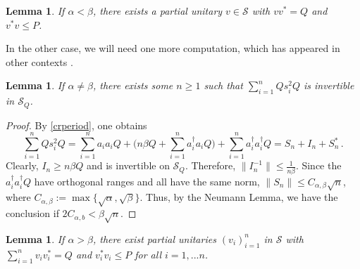 \documentclass[12pt]{amsart}
\numberwithin{equation}{section}
\def\a{\alpha}
\def\b{\beta}
\newtheorem{lem}[thm]{Lemma}
\theoremstyle{definition}
\begin{document}
\begin{lem}\label{odd}
  If $\a<\b$, there exists a partial unitary $v\in\mathcal{S}$ with $vv^*=Q$ and
  $v^*v\leq P$.
\end{lem}
In the other case, we will need one more computation, which has appeared in other contexts \cite{Sn}.
\begin{lem} \label{inverse}
If $\a\neq\b$, there exists some $n\geq 1$ such that $\sum_{i=1}^n Qs_i^2Q$ is invertible in $\mathcal S_Q$.
\end{lem}
\begin{proof}
By \eqref{crperiod}, one obtains
  $$\sum_{i=1}^nQs_i^2Q=\sum_{i=1}^na_ia_iQ +\Big(n \b Q +\sum_{i=1}^n a^\dag_i a_iQ\Big)+\sum_{i=1}^n a^\dag_ia^\dag_iQ=S_n+I_n+S_n^*\,.
  $$
  Clearly, $I_n\geq n\beta Q$ and is invertible on $\mathcal{S}_Q$. Therefore, $\displaystyle{\|I_n^{-1}\|\leq \frac 1{n\b}}$. Since the $a_i^\dagger a_i^\dagger Q$ have orthogonal ranges and all have the same norm, $\displaystyle{\|S_n\|\leq C_{\a,\b} \sqrt n}$, where $C_{\a,\b}:=\max\{\sqrt{\a},\sqrt{\b}\}$. Thus, by the Neumann Lemma, we have the conclusion if
  $\displaystyle{2C_{\a,b}<\b \sqrt n}$.
\end{proof}
\begin{lem}\label{even}
  If $\a>\b$, there exist partial unitaries $(v_i)_{i=1}^n$ in $\mathcal S$
  with $\sum_{i=1}^n v_iv_i^*=Q$ and  $v_i^*v_i\leq P$ for all $i=1,...n$.
\end{lem}
\end{document}
